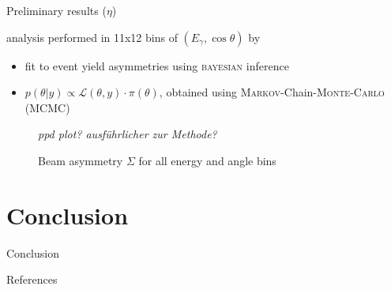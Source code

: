\documentclass[11pt,aspectratio=169,dvipsnames]{beamer}
\newcommand{\thecolor}{black!70!blue}
\begin{document}
\begin{frame}{Preliminary results ($\eta$)}
	\begin{minipage}{.35\linewidth}
\begin{tcolorbox}[colback=blue!5,colframe=\thecolor,title={Event selection ($\eta$)}]
	analysis performed in 11x12 bins of $(E_\gamma,\cos\theta)$ by \cites{eta}
\end{tcolorbox}
	\end{minipage}
	\begin{minipage}{.64\linewidth}
\begin{tcolorbox}[colback=blue!5,colframe=\thecolor,title={Method}]
	\begin{itemize}
		\item fit to event yield asymmetries using \textsc{bayesian} inference
		\item $p(\theta|y)\propto\mathcal{L}(\theta,y)\cdot\pi(\theta)$, obtained using \textsc{Markov}-Chain-\textsc{Monte-Carlo} (MCMC)
	\end{itemize}
\end{tcolorbox}
	\end{minipage}
	
	\begin{figure}
		\centering
		\emph{ppd plot? ausführlicher zur Methode?}
	\end{figure}
\end{frame}
\begin{frame}
	\begin{figure}
		\centering
		\caption*{Beam asymmetry $\Sigma$ for all energy and angle bins}
	\end{figure}
\end{frame}


\section{Conclusion}
\begin{frame}{Conclusion}
	\begin{minipage}{.49\linewidth}
		\begin{tcolorbox}[colback=blue!5,colframe=\thecolor,title={Summary}]
			\end{tcolorbox}
	\end{minipage}
\begin{minipage}{.49\linewidth}
	\begin{tcolorbox}[colback=blue!5,colframe=\thecolor,title={Outlook}]
	\end{tcolorbox}
\end{minipage}
\end{frame}


\begin{frame}[allowframebreaks]{References}
	    \printbibliography
	
\end{frame}
\end{document}
